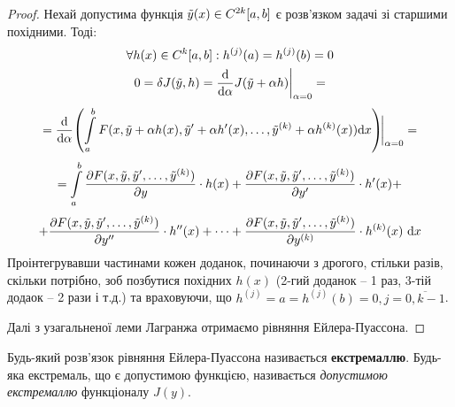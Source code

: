 \begin{proof}
   Нехай допустима функція $\tilde{y} (x) \in C^{2k} [a,b]$ є розв'язком задачі зі старшими похідними. Тоді:
   $$
\begin{gathered}
\forall h(x) \in C^{k}[a,b] : h^{(j)} (a)  = h^{(j)}(b) = 0 \\
0 = \delta J(\tilde{y}, h) = \frac{\mathrm{d}}{\mathrm{d} \alpha} J(\tilde{y} + \alpha h)\bigg|_{\alpha = 0} =
\end{gathered}
   $$
   $$
   = \frac{\mathrm{d}}{\mathrm{d} \alpha }\!  \left(   \int\limits_{a}^{b}{
   F(x,\tilde{y} + \alpha h(x) , \tilde{y}' + \alpha h'(x),\dots,
\tilde{y}^{(k)} + \alpha h^{(k)} (x)
    ) \mathrm{d} x
   } \right)\!\!\bigg|_{\alpha = 0} =
   $$
   $$
    = \int\limits_{a}^{b}{
    \frac{\partial F(x,\tilde{y}, \tilde{y}', \dots, \tilde{y}^{(k)})}{\partial y} \cdot h(x) +  \frac{\partial F(x,\tilde{y}, \tilde{y}', \dots, \tilde{y}^{(k)})}{\partial y'} \cdot h'(x) +
    }
   $$
   $$
   + \frac{\partial F(x,\tilde{y}, \tilde{y}', \dots, \tilde{y}^{(k)})}{\partial y''} \cdot h''(x) + \dots + \frac{\partial F(x,\tilde{y}, \tilde{y}', \dots, \tilde{y}^{(k)})}{\partial y^{(k)}} \cdot h^{(k)}(x) \  \mathrm{d} x
   $$
   Проінтегрувавши частинами кожен доданок, починаючи з дрогого, стільки разів, скільки потрібно, зоб позбутися похідних $h(x)$ (2-гий доданок -- 1 раз, 3-тій додаок -- 2 рази і т.д.) та враховуючи, що $h^{(j)} = a = h^{(j)} (b) = 0, j = \overline{0, k-1}$. \par Далі з узагальненої леми Лагранжа отримаємо рівняння Ейлера-Пуассона.
\end{proof}
Будь-який розв'язок рівняння Ейлера-Пуассона називається \textbf{екстремаллю}. Будь-яка екстремаль, що є допустимою функцією, називається \textit{допустимою екстремаллю} функціоналу $J(y)$.

